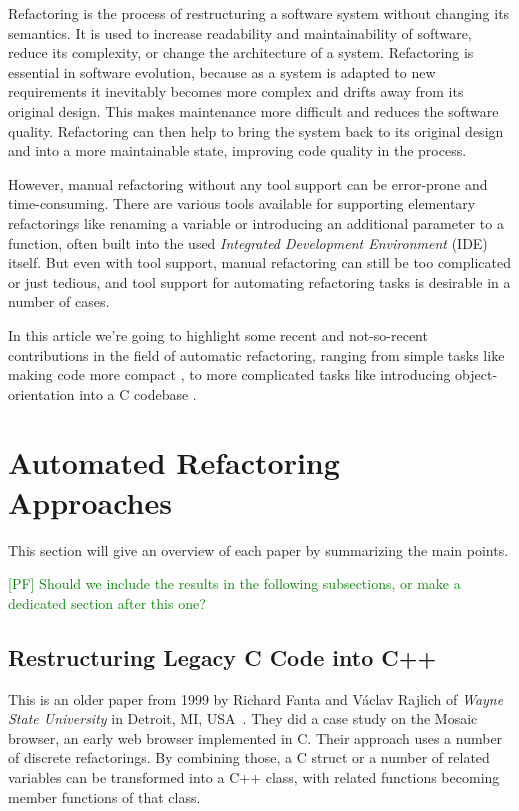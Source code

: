 \documentclass[conference,compsoc,a4paper]{IEEEtran}
\newcommand{\code}[1]{{\small\ttfamily #1}}
\newcommand{\pf}[1]{\textcolor{green}{[PF] #1}}
\begin{document}
Refactoring is the process of restructuring a software system without changing its semantics. It is used to increase 
readability and maintainability of software, reduce its complexity, or change the architecture of a system. Refactoring 
is essential in software evolution, because as a system is adapted to new requirements it inevitably becomes more 
complex and drifts away from its original design. This makes maintenance more difficult and reduces the software 
quality. Refactoring can then help to bring the system back to its original design and into a more maintainable state, 
improving code quality in the process.

However, manual refactoring without any tool support can be error-prone and time-consuming. There are various tools 
available for supporting elementary refactorings like renaming a variable or introducing an additional parameter to a 
function, often built into the used \emph{Integrated Development Environment} (IDE) itself. But even with tool support, 
manual refactoring can still be too complicated or just tedious, and tool support for automating refactoring tasks is 
desirable in a number of cases.

In this article we're going to highlight some recent and not-so-recent contributions in the field of automatic 
refactoring, ranging from simple tasks like making code more compact \cite{sparta}, to more complicated tasks like 
introducing object-orientation into a C codebase \cite{cpp}.


\section{Automated Refactoring Approaches}

This section will give an overview of each paper by summarizing the main points.

\pf{Should we include the results in the following subsections, or make a dedicated section after this one?}

\subsection{Restructuring Legacy C Code into C++}

This is an older paper from 1999 by Richard Fanta and Václav Rajlich of \emph{Wayne State University} in Detroit, MI, 
USA~\cite{cpp}. They did a case study on the Mosaic browser, an early web browser implemented in C. Their approach uses 
a number of discrete refactorings. By combining those, a C \code{struct} or a number of related variables can be 
transformed into a C++ class, with related functions becoming member functions of that class.
\end{document}
